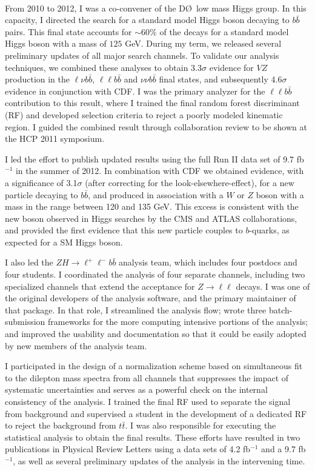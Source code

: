 \documentclass[amsmath,amssymb]{revtex4}
\def\dzero{D\O}
\begin{document}
 \\
\indent From 2010 to 2012, I was a co-convener of the
\dzero~low mass Higgs group.  In this capacity, I directed the search
for a standard model Higgs boson decaying to $b\bar{b}$ pairs.  This
final state accounts for $\sim$60\% of the decays for a standard model Higgs boson
with a mass of $125$ GeV.  During my term, we released several preliminary
updates of all major search channels.  To validate our analysis techniques, we combined these analyses
to obtain 3.3$\sigma$ evidence for $VZ$ production in the $\ell\nu b{\bar b}$, 
$\ell\ell b{\bar b}$ and $\nu\nu b{\bar b}$ final states, and subsequently
4.6$\sigma$ evidence in conjunction with CDF.    I was the primary analyzer for
the $\ell\ell b{\bar b}$ contribution to this result, where I trained the final random
forest discriminant (RF) and developed selection criteria to reject a
poorly modeled kinematic region.  I guided the combined result through collaboration review to be shown at the
HCP 2011 symposium.

I led the effort to publish updated results using the full Run II data
set of 9.7 fb$^{-1}$ in the summer of 2012.  In combination with CDF
we obtained evidence, with a significance of 3.1$\sigma$ (after correcting for
the look-elsewhere-effect), for a new particle decaying to $b{\bar b}$,
and produced in association with a $W$ or $Z$ boson with a mass in
the range between 120 and 135 GeV.  This excess is consistent with the new boson
observed in Higgs searches by the CMS and ATLAS collaborations, and provided
the first evidence that this new particle couples to $b$-quarks, as expected for a SM
Higgs boson.

I also led the $ZH\to\ell^+\ell^-b{\bar b}$ analysis team, which
includes four postdocs and four students.  I coordinated the analysis
of four separate channels, including two specialized channels that
extend the acceptance for $Z\to\ell\ell$ decays.  I was one of the
original developers of the analysis software, and the primary
maintainer of that package.  In that role, I streamlined the
analysis flow; wrote three batch-submission frameworks for the more
computing intensive portions of the analysis; and improved the
usability and documentation so that it could be easily adopted by new
members of the analysis team.

I participated in the design of a normalization scheme based on
simultaneous fit to the dilepton mass spectra from all channels that
suppresses the impact of systematic uncertainties and serves as a
powerful check on the internal consistency of the analysis.  I trained
the final RF used to separate the signal from background and
supervised a student in the development of a dedicated RF to reject the
background from $t{\bar t}$.  I was also responsible for executing the
statistical analysis to obtain the final results.  These efforts have
resulted in two publications in Physical Review Letters using a data sets
of 4.2 fb$^{-1}$ and a 9.7 fb$^{-1}$, as well as several preliminary updates of
the analysis in the intervening time.
\end{document}
